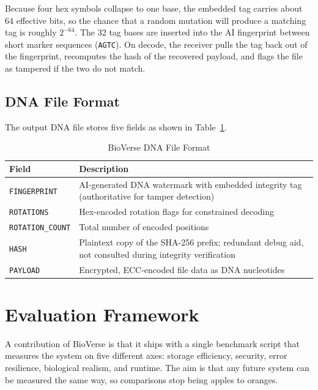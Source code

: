 \documentclass[conference]{IEEEtran}
\begin{document}
Because four hex symbols collapse to one base, the embedded tag carries about 64 effective bits, so the chance that a random mutation will produce a matching tag is roughly $2^{-64}$. The 32 tag bases are inserted into the AI fingerprint between short marker sequences (\texttt{AGTC}). On decode, the receiver pulls the tag back out of the fingerprint, recomputes the hash of the recovered payload, and flags the file as tampered if the two do not match.

\subsection{DNA File Format}

The output DNA file stores five fields as shown in Table~\ref{tab:format}.

\begin{table}[htbp]
\caption{BioVerse DNA File Format}
\begin{center}
\begin{tabular}{|l|p{5.5cm}|}
\hline
\textbf{Field} & \textbf{Description} \\
\hline
\texttt{FINGERPRINT} & AI-generated DNA watermark with embedded integrity tag (authoritative for tamper detection) \\
\hline
\texttt{ROTATIONS} & Hex-encoded rotation flags for constrained decoding \\
\hline
\texttt{ROTATION\_COUNT} & Total number of encoded positions \\
\hline
\texttt{HASH} & Plaintext copy of the SHA-256 prefix; redundant debug aid, not consulted during integrity verification \\
\hline
\texttt{PAYLOAD} & Encrypted, ECC-encoded file data as DNA nucleotides \\
\hline
\end{tabular}
\label{tab:format}
\end{center}
\end{table}

\section{Evaluation Framework}

A contribution of BioVerse is that it ships with a single benchmark script that measures the system on five different axes: storage efficiency, security, error resilience, biological realism, and runtime. The aim is that any future system can be measured the same way, so comparisons stop being apples to oranges.
\end{document}
